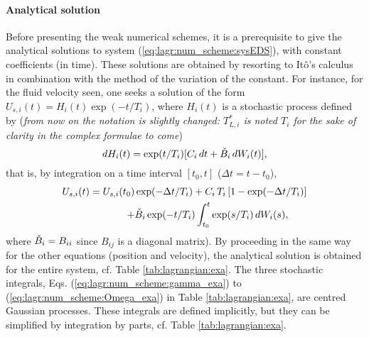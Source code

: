 \paragraph{Analytical solution} Before presenting the weak numerical schemes, it is a prerequisite to give the analytical solutions to system (\ref{eq:lagr:num_scheme:sysEDS}), with constant coefficients (in time). These solutions are obtained by resorting to It\^o's calculus in combination with the method of the variation of the constant. For instance, for the fluid velocity seen, one seeks a solution of the form $U_{s,i}(t)=H_i(t)\exp(-t/T_i)$, where $H_i(t)$ is a stochastic process defined by (\textit{from now on the notation is slightly changed: $T_{L,i}^*$ is noted $T_i$ for the sake of clarity in the complex formulae to come})
\begin{equation} \label{eq:H}
dH_i(t)=\exp(t/T_i)[C_i\,dt + \Check{B}_i\,dW_i(t)],
\end{equation}
that is, by integration on a time interval $[t_0,t]$ ($\Delta t=t-t_0$),
\begin{equation}
\begin{split}
U_{s,i}(t) = U_{s,i}(t_0)& \exp(-\Delta t/T_i)+ C_i
             \,T_i\,[1-\exp(-\Delta t/T_i)] \\
+ & \Check{B}_i \exp(-t/T_i)
    \int_{t_0}^{t}\exp(s/T_i)\,dW_i(s),
\end{split}
\end{equation}
where $\Check{B}_i=B_{ii}$ since $B_{ij}$ is a diagonal matrix). By proceeding in the same way for the other equations (position and velocity), the analytical solution is obtained for the entire system, cf. Table \ref{tab:lagrangian:exa}. The three stochastic integrals, Eqs. (\ref{eq:lagr:num_scheme:gamma_exa}) to (\ref{eq:lagr:num_scheme:Omega_exa}) in Table \ref{tab:lagrangian:exa}, are centred Gaussian processes. These integrals are defined implicitly, but they can be simplified by integration by parts, cf. Table \ref{tab:lagrangian:exa}.

